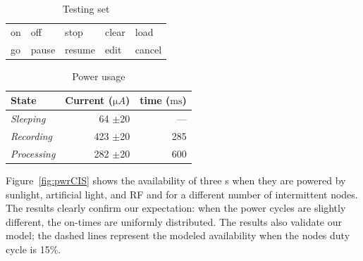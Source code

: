 \begin{table}[t]
\centering
\caption{Testing set}
\label{tab:words}
\begin{tabular}{lllll}
\hline
on    & off  & stop & clear & load   \\
go & pause & resume & edit  & cancel  \\  
\hline  
\end{tabular}
\end{table}
%
\begin{table}[t]
	\centering
	\caption{Power usage}
	\label{tab:power_usage}
	\begin{tabular}{lrr}\hline
	\textbf{State} & \textbf{Current ($\si{\micro A}$)} & \textbf{time ($\si{\milli\second}$)} \\\hline
	\textit{Sleeping} & 64 $\pm$20 & --- \\
	\textit{Recording} & 423 $\pm$20 & 285   \\
	\textit{Processing} &  282 $\pm$20 & 600\\\hline
	\end{tabular}
\end{table}

Figure~\ref{fig:pwrCIS} shows the availability of three \cis{}s when they are powered by sunlight, artificial light, and RF and for a different number of intermittent nodes.
The results clearly confirm our expectation: when the power cycles are slightly different, the on-times are uniformly distributed. The results also validate our model; the dashed lines represent the modeled availability when the nodes duty cycle is 15\%.

